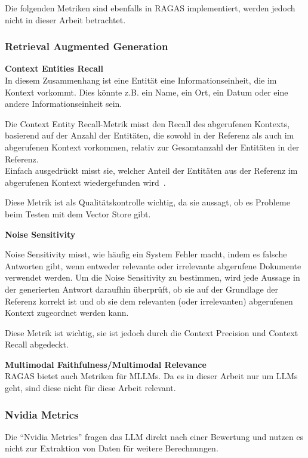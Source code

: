 Die folgenden Metriken sind ebenfalls in RAGAS implementiert, werden jedoch nicht in dieser Arbeit betrachtet.

\subsubsection{Retrieval Augmented Generation}

\textbf{Context Entities Recall}\\
In diesem Zusammenhang ist eine Entität eine Informationseinheit, die im Kontext vorkommt.
Dies könnte z.B. ein Name, ein Ort, ein Datum oder eine andere Informationseinheit sein.

\begin{plainquote}
Die Context Entity Recall-Metrik misst den Recall des abgerufenen Kontexts, basierend auf der Anzahl der Entitäten, die sowohl in der Referenz als auch im abgerufenen Kontext vorkommen, relativ zur Gesamtanzahl der Entitäten in der Referenz.\\
Einfach ausgedrückt misst sie, welcher Anteil der Entitäten aus der Referenz im abgerufenen Kontext wiedergefunden wird~\cite{ragas_context_entities_recall}.
\end{plainquote}
Diese Metrik ist als Qualitätskontrolle wichtig, da sie aussagt, ob es Probleme beim Testen mit dem Vector Store gibt.

\textbf{Noise Sensitivity}\\
\begin{plainquote}
Noise Sensitivity misst, wie häufig ein System Fehler macht, indem es falsche Antworten gibt, wenn entweder relevante oder irrelevante abgerufene Dokumente verwendet werden.
Um die Noise Sensitivity zu bestimmen, wird jede Aussage in der generierten Antwort daraufhin überprüft, ob sie auf der Grundlage der Referenz korrekt ist und ob sie dem relevanten (oder irrelevanten) abgerufenen Kontext zugeordnet werden kann.
\cite{ragas_noise_sensitivity}
\end{plainquote}
Diese Metrik ist wichtig, sie ist jedoch durch die Context Precision und Context Recall abgedeckt.

\textbf{Multimodal Faithfulness/Multimodal Relevance}\\
RAGAS bietet auch Metriken für MLLMs. Da es in dieser Arbeit nur um LLMs geht, sind diese nicht für diese Arbeit relevant.

\subsubsection{Nvidia Metrics}
Die \enquote{Nvidia Metrics} fragen das LLM direkt nach einer Bewertung und nutzen es nicht zur Extraktion von Daten für weitere Berechnungen.

